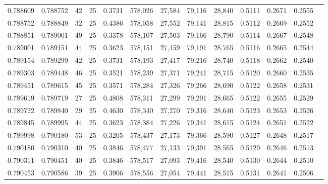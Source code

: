 \begin{tabular}{rrrrrrrrrrrrr}
0.788609 & 0.788752 &    42 &  25 &                                     0.3731 & 578,026 &  27,584 &  79,116 &  28,840 & 0.5111 & 0.2671 & 0.2555 \\
0.788752 & 0.788849 &    32 &  25 &                                     0.4386 & 578,058 &  27,552 &  79,141 &  28,815 & 0.5112 & 0.2669 & 0.2552 \\
0.788851 & 0.789001 &    49 &  25 &                                     0.3378 & 578,107 &  27,503 &  79,166 &  28,790 & 0.5114 & 0.2667 & 0.2548 \\
0.789001 & 0.789151 &    44 &  25 &                                     0.3623 & 578,151 &  27,459 &  79,191 &  28,765 & 0.5116 & 0.2665 & 0.2544 \\
0.789154 & 0.789299 &    42 &  25 &                                     0.3731 & 578,193 &  27,417 &  79,216 &  28,740 & 0.5118 & 0.2662 & 0.2540 \\
0.789303 & 0.789448 &    46 &  25 &                                     0.3521 & 578,239 &  27,371 &  79,241 &  28,715 & 0.5120 & 0.2660 & 0.2535 \\
0.789451 & 0.789615 &    45 &  25 &                                     0.3571 & 578,284 &  27,326 &  79,266 &  28,690 & 0.5122 & 0.2658 & 0.2531 \\
0.789619 & 0.789719 &    27 &  25 &                                     0.4808 & 578,311 &  27,299 &  79,291 &  28,665 & 0.5122 & 0.2655 & 0.2529 \\
0.789722 & 0.789840 &    29 &  25 &                                     0.4630 & 578,340 &  27,270 &  79,316 &  28,640 & 0.5123 & 0.2653 & 0.2526 \\
0.789845 & 0.789995 &    44 &  25 &                                     0.3623 & 578,384 &  27,226 &  79,341 &  28,615 & 0.5124 & 0.2651 & 0.2522 \\
0.789998 & 0.790180 &    53 &  25 &                                     0.3205 & 578,437 &  27,173 &  79,366 &  28,590 & 0.5127 & 0.2648 & 0.2517 \\
0.790180 & 0.790310 &    40 &  25 &                                     0.3846 & 578,477 &  27,133 &  79,391 &  28,565 & 0.5129 & 0.2646 & 0.2513 \\
0.790311 & 0.790451 &    40 &  25 &                                     0.3846 & 578,517 &  27,093 &  79,416 &  28,540 & 0.5130 & 0.2644 & 0.2510 \\
0.790453 & 0.790586 &    39 &  25 &                                     0.3906 & 578,556 &  27,054 &  79,441 &  28,515 & 0.5131 & 0.2641 & 0.2506 \\

\end{tabular}
